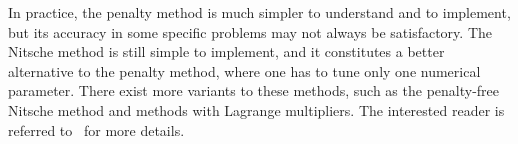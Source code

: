In practice, the penalty method is much simpler to understand and to implement, but its accuracy in some specific problems may not always be satisfactory. The Nitsche method is still simple to implement, and it constitutes a better alternative to the penalty method, where one has to tune only one numerical parameter. There exist more variants to these methods, such as the penalty-free Nitsche method and methods with Lagrange multipliers. The interested reader is referred to~\cite{Chouly2024} for more details.



